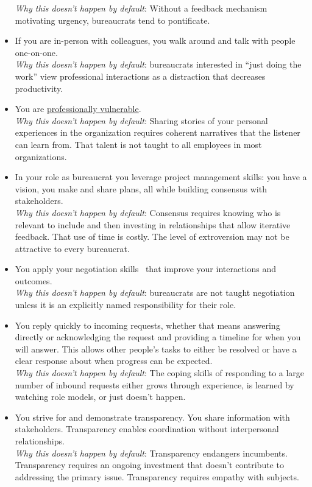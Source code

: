 \begin{itemize}
    \textit{Why this doesn't happen by default}: Without a feedback mechanism motivating urgency, bureaucrats tend to pontificate. 
    \item If you are in-person with colleagues, you walk around and talk with people one-on-one.  \\
    \textit{Why this doesn't happen by default}: bureaucrats interested in ``just doing the work'' view professional interactions as a distraction that decreases productivity. 
    \item You are 
%
    \hyperref[sec:professional-vulnerability]{professionally vulnerable}. \\
    \textit{Why this doesn't happen by default}: Sharing stories of your personal experiences in the organization requires coherent narratives that the listener can learn from. That talent is not taught to all employees in most organizations. 
    \item In your role as bureaucrat you leverage project management skills: you have a vision, you make and share plans, all while building consensus with stakeholders. \\
    \textit{Why this doesn't happen by default}: Consensus requires knowing who is relevant to include and then investing in relationships that allow iterative feedback. That use of time is costly. The level of extroversion may not be attractive to every bureaucrat.
    \item You apply your negotiation skills~\cite{1982_Cohen} that improve your interactions and outcomes.\\
    \textit{Why this doesn't happen by default}: bureaucrats are not taught negotiation unless it is an explicitly named responsibility for their role. 
    \item You reply quickly to incoming requests, whether that means answering directly or acknowledging the request and providing a timeline for when you will answer. This allows other people's tasks to either be resolved or have a clear response about when progress can be expected. \\
    \textit{Why this doesn't happen by default}: The coping skills of responding to a large number of inbound requests either grows through experience, is learned by watching role models, or just doesn't happen.
    \item You strive for and demonstrate transparency. You share information with stakeholders. Transparency  enables coordination without interpersonal relationships.\\
    \textit{Why this doesn't happen by default}: Transparency endangers incumbents. Transparency requires an ongoing investment that doesn't contribute to addressing the primary issue. Transparency requires empathy with subjects.
\end{itemize}

